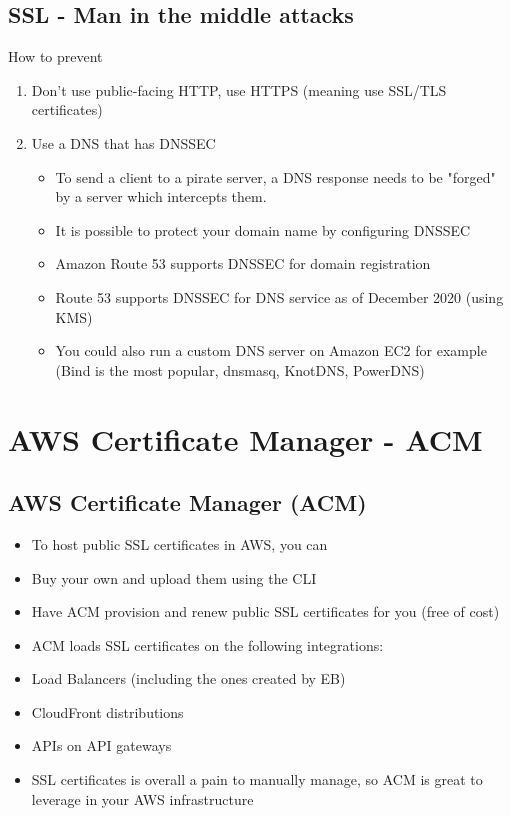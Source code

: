 \subsection{SSL - Man in the middle attacks}
How to prevent
\begin{enumerate}
    \item Don't use public-facing HTTP, use HTTPS (meaning use SSL/TLS certificates)
    \item Use a DNS that has DNSSEC
    \begin{itemize}
        \item To send a client to a pirate server, a DNS response needs to be "forged" by a server which intercepts them.
        \item It is possible to protect your domain name by configuring DNSSEC
        \item Amazon Route 53 supports DNSSEC for domain registration
        \item Route 53 supports DNSSEC for DNS service as of December 2020 (using KMS)
        \item You could also run a custom DNS server on Amazon EC2 for example (Bind is the most popular, dnsmasq, KnotDNS, PowerDNS)
    \end{itemize}
\end{enumerate}


\section{AWS Certificate Manager - ACM}

\subsection{AWS Certificate Manager (ACM)}
\begin{itemize}
    \item To host public SSL certificates in AWS, you can
    \item Buy your own and upload them using the CLI
    \item Have ACM provision and renew public SSL certificates for you (free of cost)

    \item ACM loads SSL certificates on the following integrations:
    \item Load Balancers (including the ones created by EB)
    \item CloudFront distributions
    \item APIs on API gateways

    \item SSL certificates is overall a pain to manually manage, so ACM is great to leverage in your AWS infrastructure
\end{itemize}

